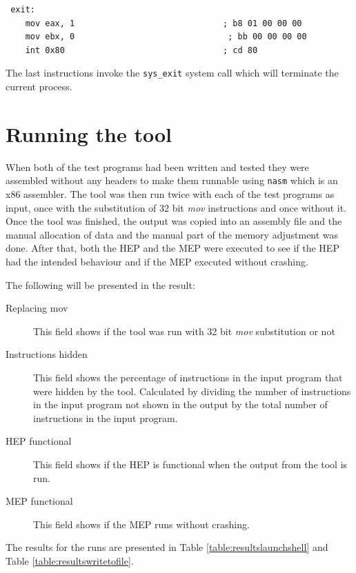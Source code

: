 \documentclass[11pt,twoside]{eitExjobb}
\begin{document}
\begin{verbatim}
 exit:
    mov eax, 1                              ; b8 01 00 00 00 
    mov ebx, 0	                             ; bb 00 00 00 00 
    int 0x80                                ; cd 80
\end{verbatim}

\noindent The last instructions invoke the \texttt{sys\_exit} system call which will terminate the current process. 

\section{Running the tool}
When both of the test programs had been written and tested they were assembled without any headers to make them runnable using \texttt{nasm}\cite{nasm} which is an x86 assembler. The tool was then run twice with each of the test programs as input, once with the substitution of 32 bit \emph{mov} instructions and once without it. Once the tool was finished, the output was copied into an assembly file and the manual allocation of data and the manual part of the memory adjustment was done. After that, both the HEP and the MEP were executed to see if the HEP had the intended behaviour and if the MEP executed without crashing.

The following will be presented in the result:
\begin{description}
\item[Replacing mov] This field shows if the tool was run with 32 bit \emph{mov} substitution or not
\item[Instructions hidden] This field shows the percentage of instructions in the input program that were hidden by the tool. Calculated by dividing the number of instructions in the input program not shown in the output by the total number of instructions in the input program.
\item[HEP functional] This field shows if the HEP is functional when the output from the tool is run.
\item[MEP functional] This field shows if the MEP runs without crashing.
\end{description}

\noindent The results for the runs are presented in Table \ref{table:resultslaunchshell} and Table \ref{table:resultswritetofile}.
\end{document}
